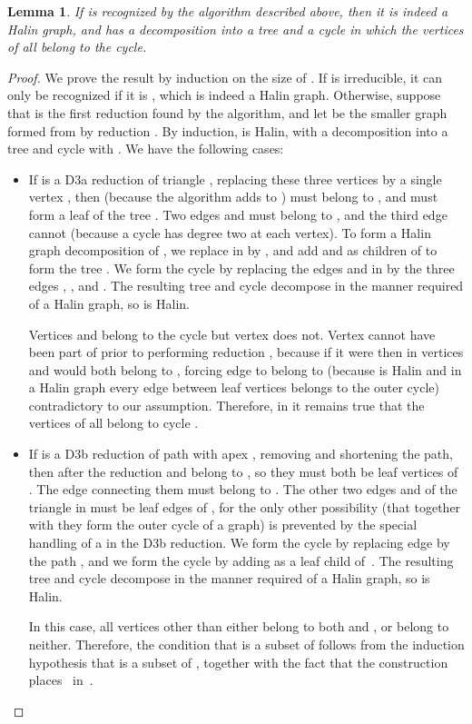 \documentclass{article}
\newtheorem{lemma}{Lemma}
\begin{document}
\begin{lemma}
\label{lem:no-false-pos}
If  is recognized by the algorithm described above, then it is indeed a Halin graph, and has a decomposition into a tree  and a cycle  in which the vertices of  all belong to the cycle. \end{lemma}

\begin{proof}
We prove the result by induction on the size of . If  is irreducible, it can only be recognized if it is , which is indeed a Halin graph. Otherwise, suppose that  is the first reduction found by the algorithm, and let  be the smaller graph formed from  by reduction . By induction,  is Halin, with a decomposition into a tree  and cycle  with . We have the following cases:
\begin{itemize}
\item If  is a D3a reduction of triangle , replacing these three vertices by a single vertex , then (because the algorithm adds  to )  must belong to , and must form a leaf of the tree .  Two edges  and  must belong to , and the third edge  cannot (because a cycle has degree two at each vertex). To form a Halin graph decomposition of , we replace  in  by , and add  and  as children of  to form the tree . We form the cycle  by replacing the edges  and  in  by the three edges , , and . The resulting tree and cycle decompose  in the manner required of a Halin graph, so  is Halin.

Vertices  and  belong to the cycle  but vertex  does not. Vertex  cannot have been part of  prior to performing reduction ,
because if it were then in  vertices  and  would both belong to , forcing edge  to belong to  (because  is Halin and in a Halin graph every edge between leaf vertices belongs to the outer cycle) contradictory to our assumption. Therefore, in  it remains true that the vertices of  all belong to cycle .
\item If  is a D3b reduction of path  with apex , removing  and shortening the path,
then after the reduction  and  belong to , so they must both be leaf vertices of . The edge  connecting them must belong to . The other two edges  and  of the triangle  in  must be leaf edges of , for the only other possibility (that together with  they form the outer cycle of a  graph) is prevented by the special handling of a  in the D3b reduction. We form the cycle  by replacing edge  by the path , and we form the cycle  by adding  as a leaf child of~. The resulting tree and cycle decompose  in the manner required of a Halin graph, so  is Halin.

In this case, all vertices other than  either belong to both  and , or belong to neither.
Therefore, the condition that  is a subset of  follows from the induction hypothesis that  is a subset of , together with the fact that the construction places ~in~.\qedhere
\end{itemize}
\end{proof}
\end{document}
